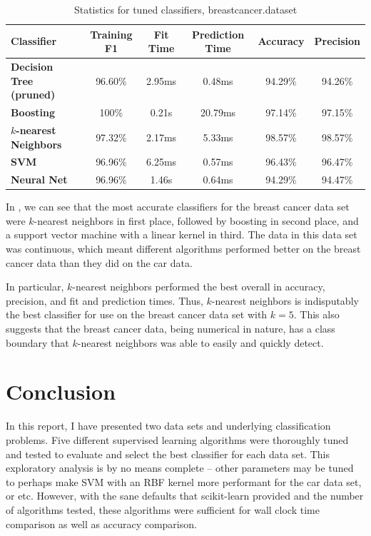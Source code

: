 \documentclass{article}
\begin{document}
    \begin{table}[h!]
    \centering
    \begin{tabular}{||l c c c c c||} 
     \hline
     \textbf{Classifier} & Training F1 & Fit Time & Prediction Time & Accuracy & Precision \\
     \hline
     \textbf{Decision Tree (pruned)} & 96.60\% & 2.95ms & 0.48ms & 94.29\% & 94.26\% \\ 
     \textbf{Boosting} & 100\% & 0.21s & 20.79ms & 97.14\% & 97.15\% \\
     \textbf{$k$-nearest Neighbors} & 97.32\% & 2.17ms & 5.33ms & 98.57\% & 98.57\% \\
     \textbf{SVM} & 96.96\% & 6.25ms & 0.57ms & 96.43\% & 96.47\% \\
     \textbf{Neural Net} & 96.96\% & 1.46s & 0.64ms & 94.29\% & 94.47\% \\
     \hline
    \end{tabular}
    \caption{Statistics for tuned classifiers, breastcancer.dataset}
    \label{tab:breastcancer-stats}
    \end{table}

    In , we can see that the most accurate classifiers for the breast cancer data set were $k$-nearest neighbors in first place, followed by boosting in second place, and a support vector machine with a linear kernel in third. The data in this data set was continuous, which meant different algorithms performed better on the breast cancer data than they did on the car data.

    In particular, $k$-nearest neighbors performed the best overall in accuracy, precision, and fit and prediction times. Thus, $k$-nearest neighbors is indisputably the best classifier for use on the breast cancer data set with $k=5$. This also suggests that the breast cancer data, being numerical in nature, has a class boundary that $k$-nearest neighbors was able to easily and quickly detect.

    \section{Conclusion}
    In this report, I have presented two data sets and underlying classification problems. Five different supervised learning algorithms were thoroughly tuned and tested to evaluate and select the best classifier for each data set. This exploratory analysis is by no means complete -- other parameters may be tuned to perhaps make SVM with an RBF kernel more performant for the car data set, or etc. However, with the sane defaults that scikit-learn provided and the number of algorithms tested, these algorithms were sufficient for wall clock time comparison as well as accuracy comparison.
\end{document}
